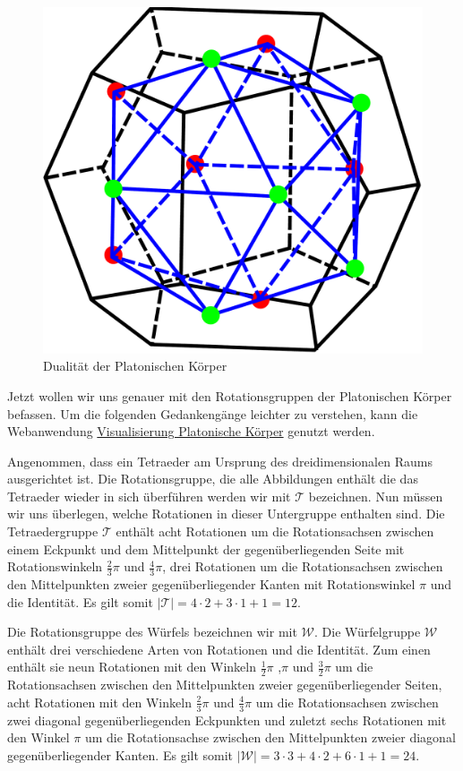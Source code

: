 \begin{figure}[H]
\centering
\includegraphics[width=0.4\linewidth]{grafiken/dual_dodekaeder}
\caption{Dualität der Platonischen Körper}
\label{fig:Duality_Dodek-Iso}
\end{figure}

Jetzt wollen wir uns genauer mit den Rotationsgruppen der Platonischen Körper befassen. Um die folgenden Gedankengänge leichter zu verstehen, kann die Webanwendung \href{http://www-stud.uni-due.de/~simibark/visualisierung-platonische-koerper}{Visualisierung Platonische Körper} genutzt werden.

Angenommen, dass ein Tetraeder am Ursprung des dreidimensionalen Raums ausgerichtet ist. Die Rotationsgruppe, die alle Abbildungen enthält die das Tetraeder wieder in sich überführen werden wir mit $\mathcal{T}$ bezeichnen. Nun müssen wir uns überlegen, welche Rotationen in dieser Untergruppe enthalten sind. Die Tetraedergruppe $\mathcal{T}$ enthält acht Rotationen um die Rotationsachsen zwischen einem Eckpunkt und dem Mittelpunkt der gegenüberliegenden Seite mit Rotationswinkeln $\frac{2}{3}\pi$ und $\frac{4}{3}\pi$, drei Rotationen um die Rotationsachsen zwischen den Mittelpunkten zweier gegenüberliegender Kanten mit Rotationswinkel $\pi$ und die Identität. Es gilt somit $| \mathcal{T} | = 4 \cdot 2 + 3 \cdot 1 + 1 = 12$.

Die Rotationsgruppe des Würfels bezeichnen wir mit $\mathcal{W}$. Die Würfelgruppe $\mathcal{W}$ enthält drei verschiedene Arten von Rotationen und die Identität. Zum einen enthält sie neun Rotationen mit den Winkeln $\frac{1}{2}\pi$ ,$\pi$ und $\frac{3}{2}\pi$ um die Rotationsachsen zwischen den Mittelpunkten zweier gegenüberliegender Seiten, acht Rotationen mit den Winkeln $\frac{2}{3}\pi$ und $\frac{4}{3}\pi$ um die Rotationsachsen zwischen zwei diagonal gegenüberliegenden Eckpunkten und zuletzt sechs Rotationen mit den Winkel $\pi$ um die Rotationsachse zwischen den Mittelpunkten zweier diagonal gegenüberliegender Kanten. Es gilt somit $| \mathcal{W} | = 3 \cdot 3 + 4 \cdot 2 + 6 \cdot 1 + 1 = 24$.

